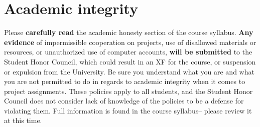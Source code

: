 \documentclass[11pt]{article}
\begin{document}
    \vspace{-4.5mm}

  \section{Academic integrity}

    Please \textbf{carefully read} the academic honesty section of the course
  syllabus.  \textbf{Any evidence} of impermissible cooperation on projects,
  use of disallowed materials or resources, or unauthorized use of computer
  accounts, \textbf{will be submitted} to the Student Honor Council, which
  could result in an XF for the course, or suspension or expulsion from the
  University.  Be sure you understand what you are and what you are not
  permitted to do in regards to academic integrity when it comes to project
  assignments.  These policies apply to all students, and the Student Honor
  Council does not consider lack of knowledge of the policies to be a
  defense for violating them.  Full information is found in the course
  syllabus-- please review it at this time.
\end{document}
